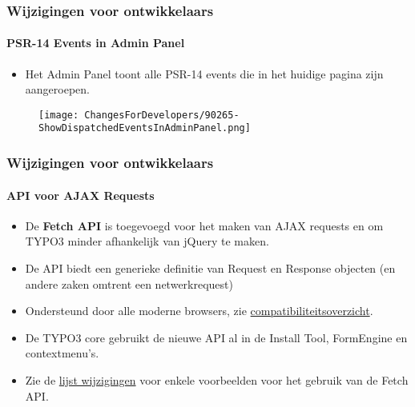 
\begin{frame}[fragile]
	\frametitle{Wijzigingen voor ontwikkelaars}
	\framesubtitle{PSR-14 Events in Admin Panel}

	\begin{itemize}
		\item Het Admin Panel toont alle PSR-14 events die in het huidige pagina zijn aangeroepen.
	\end{itemize}

	\begin{figure}
		\texttt{[image: ChangesForDevelopers/90265-ShowDispatchedEventsInAdminPanel.png]}
	\end{figure}

\end{frame}


\begin{frame}[fragile]
	\frametitle{Wijzigingen voor ontwikkelaars}
	\framesubtitle{API voor AJAX Requests}

	\lstset{basicstyle=\tiny\ttfamily}

	\begin{itemize}
		\item De \textbf{Fetch API} is toegevoegd voor het maken van AJAX requests
			en om TYPO3 minder afhankelijk van jQuery te maken.
		\item De API biedt een generieke definitie van Request en Response objecten
			(en andere zaken omtrent een netwerkrequest)
		\item Ondersteund door alle moderne browsers, zie
			\href{https://developer.mozilla.org/en-US/docs/Web/API/Fetch_API}{compatibiliteitsoverzicht}.
		\item De TYPO3 core gebruikt de nieuwe API al in de Install Tool, FormEngine en
			contextmenu's.
		\item Zie de
			\href{https://docs.typo3.org/c/typo3/cms-core/master/en-us/Changelog/10.3/Feature-89738-ApiForAjaxRequests.html}{lijst wijzigingen}
			voor enkele voorbeelden voor het gebruik van de Fetch API.

	\end{itemize}

\end{frame}

